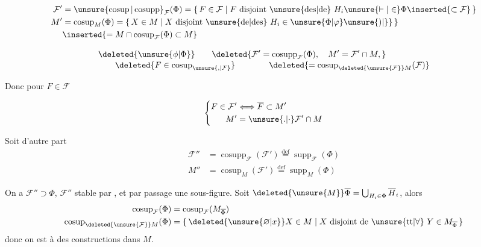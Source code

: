 \[
\begin{aligned}
\mathcal F'&=\unsure{\operatorname{cosup}|\operatorname{cosupp}}_{\mathcal F}(\Phi)=\{\,F\in\mathcal F\mid F\ \text{disjoint \unsure{des|de} }H_i\unsure{\vdash|\in}\Phi\inserted{\subset\mathcal F}\,\}\\
M'&=\operatorname{cosup}_{M}(\Phi)=\{\,X\in M\mid X\ \text{disjoint \unsure{de|des} }H_i\in\unsure{\Phi|\varphi}\unsure{)|\}}\,\}\\
&\inserted{=M\cap\operatorname{cosup}_{\mathcal F}(\Phi)\subset M}
\end{aligned}
\]


\[
\begin{aligned}
&\deleted{\unsure{\phi|\Phi}}\qquad
\deleted{\mathcal F'=\operatorname{cosupp}_{\mathcal F}(\Phi),\quad M'=\mathcal F'\cap M,}\\[-2pt]
&\qquad\deleted{F\in\operatorname{cosup}_{\unsure{,|\mathcal F}}}
\qquad\qquad\deleted{=\operatorname{cosup}_{\deleted{\unsure{\mathcal F}}M}(\mathcal F)}
\end{aligned}
\]

Donc pour $F\in\mathcal F$

\[
\left\{\begin{aligned}
F\in\mathcal F'&\Longleftrightarrow\overline F\subset M'\\
M'&=\unsure{.|\cdot}\mathcal F'\cap M
\end{aligned}\right.
\]

Soit d'autre part
\[
\begin{aligned}
\mathcal F''&=\operatorname{cosupp}_{\mathcal F}(\mathcal F')\overset{\text{def}}{=}\operatorname{supp}_{\mathcal F}(\Phi)\\
M''&=\operatorname{cosup}_{M}(\mathcal F')\overset{\text{def}}{=}\operatorname{supp}_{M}(\Phi)
\end{aligned}
\]

On a  $\mathcal F''\supset\Phi$, $\mathcal F''$ stable par ,  et par passage  une sous-figure. Soit $\deleted{\unsure{M}} \overline\Phi=\bigcup_{H_i\in\Phi}\overline H_i$, alors
\[
\begin{aligned}
\operatorname{cosup}_{\mathcal F}(\Phi)&=\operatorname{cosup}_{\mathcal F}(M_{\overline\Phi})\\
\operatorname{cosup}_{\deleted{\unsure{\mathcal F}}M}(\Phi)&=\{\,\deleted{\unsure{\varnothing|x}}X\in M\mid X\ \text{disjoint de }\unsure{\mathrm{tt}|\forall}\ Y\in M_{\overline\Phi}\,\}
\end{aligned}
\]
donc on est  à des constructions dans $M$. 

